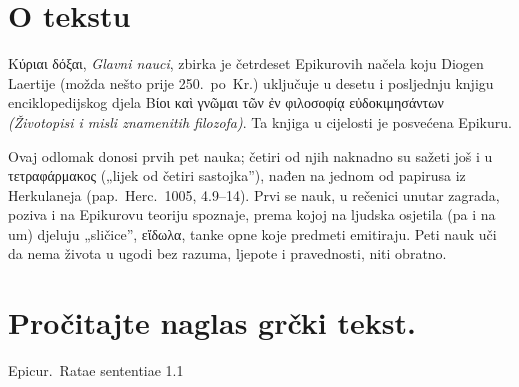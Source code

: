 
\section*{O tekstu}

\textgreek[variant=ancient]{Κύριαι δόξαι,} \textit{Glavni nauci}, zbirka je četrdeset Epikurovih načela koju Diogen Laertije (možda nešto prije 250.\ po~Kr.) uključuje u desetu i posljednju knjigu enciklopedijskog djela \textgreek[variant=ancient]{Βίοι καὶ γνῶμαι τῶν ἐν φιλοσοφίᾳ εὐδοκιμησάντων} \textit{(Životopisi i misli znamenitih filozofa)}. Ta knjiga u cijelosti je posvećena Epikuru.

Ovaj odlomak donosi prvih pet nauka; četiri od njih naknadno su sažeti još i u τετραφάρμακος („lijek od četiri sastojka”), nađen na jednom od papirusa iz Herkulaneja (pap.\ Herc.\ 1005, 4.9–14). Prvi se nauk, u rečenici unutar zagrada, poziva i na Epikurovu teoriju spoznaje, prema kojoj na ljudska osjetila (pa i na um) djeluju „sličice”, εἴδωλα, tanke opne koje predmeti emitiraju. Peti nauk uči da nema života u ugodi bez razuma, ljepote i pravednosti, niti obratno.




\section*{Pročitajte naglas grčki tekst.}

Epicur.\ Ratae sententiae 1.1


\medskip


